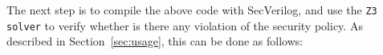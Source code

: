 \documentclass [12pt, oneside, a4paper]{article}
\newcommand{\code}[1]{\texttt{#1}}
\begin{document}
{%

The next step is to compile the above code with SecVerilog, and use
the \code{Z3 solver} to verify whether is there any violation of
the security policy. As described in Section~\ref{sec:usage}, this can
be done as follows:

}
\end{document}
